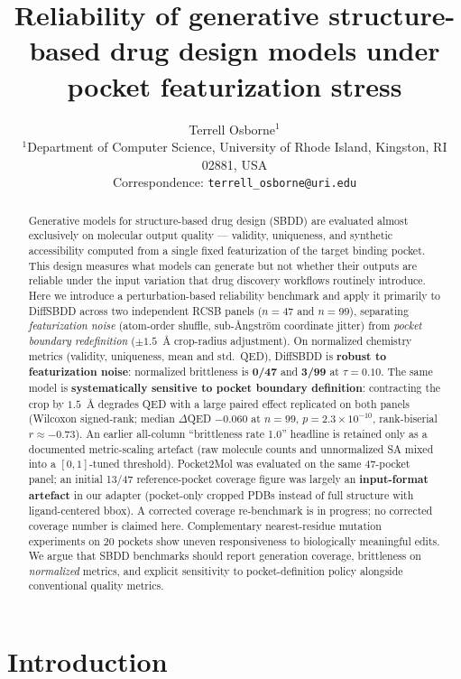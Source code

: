 \documentclass[11pt]{article}
\title{Reliability of generative structure-based drug design models under pocket featurization stress}
\author{%
  Terrell Osborne$^{1}$\\
  \small $^{1}$Department of Computer Science, University of Rhode Island, Kingston, RI 02881, USA\\
  \small Correspondence: \texttt{terrell\_osborne@uri.edu}%
}
\date{}
\begin{document}
\maketitle

\begin{abstract}
Generative models for structure-based drug design (SBDD) are evaluated almost exclusively on molecular output quality --- validity, uniqueness, and synthetic accessibility computed from a single fixed featurization of the target binding pocket. This design measures what models can generate but not whether their outputs are reliable under the input variation that drug discovery workflows routinely introduce. Here we introduce a perturbation-based reliability benchmark and apply it primarily to DiffSBDD across two independent RCSB panels ($n=47$ and $n=99$), separating \emph{featurization noise} (atom-order shuffle, sub-\r{A}ngstr\"{o}m coordinate jitter) from \emph{pocket boundary redefinition} ($\pm 1.5$~\r{A} crop-radius adjustment). On normalized chemistry metrics (validity, uniqueness, mean and std.\ QED), DiffSBDD is \textbf{robust to featurization noise}: normalized brittleness is \textbf{0/47} and \textbf{3/99} at $\tau=0.10$. The same model is \textbf{systematically sensitive to pocket boundary definition}: contracting the crop by $1.5$~\r{A} degrades QED with a large paired effect replicated on both panels (Wilcoxon signed-rank; median $\Delta$QED $-0.060$ at $n=99$, $p=2.3\times10^{-10}$, rank-biserial $r\approx-0.73$). An earlier all-column ``brittleness rate 1.0'' headline is retained only as a documented metric-scaling artefact (raw molecule counts and unnormalized SA mixed into a $[0,1]$-tuned threshold). Pocket2Mol was evaluated on the same 47-pocket panel; an initial 13/47 reference-pocket coverage figure was largely an \textbf{input-format artefact} in our adapter (pocket-only cropped PDBs instead of full structure with ligand-centered bbox). A corrected coverage re-benchmark is in progress; no corrected coverage number is claimed here. Complementary nearest-residue mutation experiments on 20 pockets show uneven responsiveness to biologically meaningful edits. We argue that SBDD benchmarks should report generation coverage, brittleness on \emph{normalized} metrics, and explicit sensitivity to pocket-definition policy alongside conventional quality metrics.
\end{abstract}

\section{Introduction}
\end{document}
